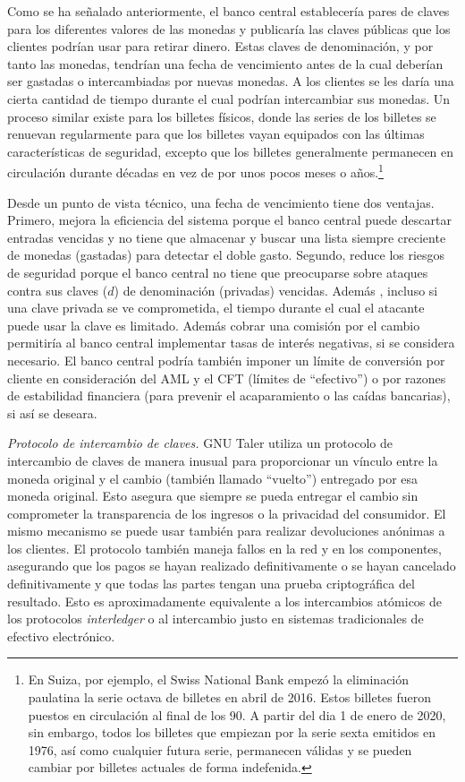\documentclass[10pt,spanish]{article}
\begin{document}
Como se ha señalado anteriormente, el banco central establecería pares
de claves para los diferentes valores de las monedas y publicaría las
claves públicas que los clientes podrían usar para retirar dinero. Estas
claves de denominación, y por tanto las monedas, tendrían una fecha de
vencimiento antes de la cual deberían ser gastadas o intercambiadas por
nuevas monedas. A los clientes se les daría una cierta cantidad de
tiempo durante el cual podrían intercambiar sus monedas. Un proceso
similar existe para los billetes físicos, donde las series de los
billetes se renuevan regularmente para que los billetes vayan equipados
con las últimas características de seguridad, excepto que los billetes
generalmente permanecen en circulación durante décadas en vez de por
unos pocos meses o años.\footnote{En Suiza, por ejemplo, el Swiss
National Bank empezó la eliminación paulatina la serie octava de
billetes en abril de 2016. Estos billetes fueron puestos en
circulación al final de los 90. A partir del dia 1 de enero de 2020,
sin embargo, todos los billetes que empiezan por la serie sexta
emitidos en 1976, así como cualquier futura serie, permanecen válidas
y se pueden cambiar por billetes actuales de forma indefenida.}

Desde un punto de vista técnico, una fecha de vencimiento tiene dos
ventajas. Primero, mejora la eficiencia del sistema porque el banco
central puede descartar entradas vencidas y no tiene que almacenar y
buscar una lista siempre creciente de monedas (gastadas) para detectar
el doble gasto. Segundo, reduce los riesgos de seguridad porque el banco
central no tiene que preocuparse sobre ataques contra sus claves
($d$) de denominación (privadas) vencidas. Además , incluso si una
clave privada se ve comprometida, el tiempo durante el cual el atacante
puede usar la clave es limitado. Además cobrar una comisión por el
cambio permitiría al banco central implementar tasas de interés
negativas, si se considera necesario. El banco central podría también
imponer un límite de conversión por cliente en consideración del AML y
el CFT (límites de ``efectivo'') o por razones de estabilidad
financiera (para prevenir el acaparamiento o las caídas bancarias), si
así se deseara.

\emph{Protocolo de intercambio de claves.} GNU Taler utiliza un
protocolo de intercambio de claves de manera inusual para proporcionar
un vínculo entre la moneda original y el cambio (también llamado
``vuelto'') entregado por esa moneda original. Esto asegura que siempre
se pueda entregar el cambio sin comprometer la transparencia de los
ingresos o la privacidad del consumidor. El mismo mecanismo se puede
usar también para realizar devoluciones anónimas a los clientes. El
protocolo también maneja fallos en la red y en los componentes,
asegurando que los pagos se hayan realizado definitivamente o se hayan
cancelado definitivamente y que todas las partes tengan una prueba
criptográfica del resultado. Esto es aproximadamente equivalente a los
intercambios atómicos de los protocolos \emph{interledger} o al
intercambio justo en sistemas tradicionales de efectivo electrónico.
\end{document}
